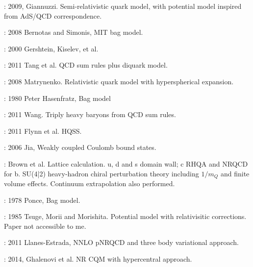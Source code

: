 \documentclass[showkeys,aps,10pt,twocolumn,showpacs,preprintnumbers,amsmath,amssymb,prd,letterpaper,floatfix,nofootinbib,superscriptaddress,]{revtex4-1}
\begin{document}
\item[] \cite{Giannuzzi:2009gh} : 2009, Giannuzzi. Semi-relativistic quark model, with potential model inspired from AdS/QCD correspondence. 

\item[] \cite{Bernotas:2008fv, Bernotas:2008bu} : 2008 Bernotas and Simonis, MIT bag model. 

\item[] \cite{Gershtein:2000nx} : 2000 Gershtein, Kiselev, et al. 

\item[] \cite{Tang:2011fv} : 2011 Tang et al. QCD sum rules plus diquark model. 

\item[] \cite{Martynenko:2007je} : 2008 Matrynenko. Relativistic quark model with hyperspherical expansion. 

\item[] \cite{Hasenfratz:1980ka} : 1980 Peter Hasenfratz, Bag model 

\item[] \cite{Wang:2011ae} : 2011 Wang. Triply heavy baryons from QCD sum rules. 

\item[] \cite{Flynn:2011gf} : 2011 Flynn et al. HQSS. 

\item[] \cite{Jia:2006gw} : 2006 Jia, Weakly coupled Coulomb bound states. 

\item[] \cite{Brown:2014ena} : Brown et al. Lattice calculation. u, d and s domain wall; c RHQA and NRQCD for b. 
         SU(4|2) heavy-hadron chiral perturbation theory including $1/m_Q$ and finite volume effects. 
         Continuum extrapolation also performed.  

\item[] \cite{Ponce:1978gk} : 1978 Ponce, Bag model.

\item[] \cite{Tsuge:1985ei} : 1985 Tsuge, Morii and Morishita. Potential model with relativisitic corrections. 
                              Paper not accessible to me. 

\item[] \cite{LlanesEstrada:2011kc} : 2011 Llanes-Estrada, NNLO pNRQCD and three body variational approach. 

\item[] \cite{Ghalenovi:2014swa} : 2014, Ghalenovi et al. NR CQM with hypercentral approach. 
\end{document}
